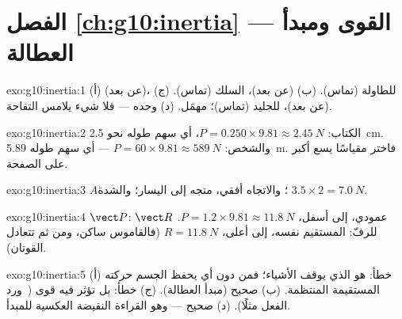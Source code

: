 \section*{الفصل \ref{ch:g10:inertia} --- القوى ومبدأ العطالة}

\begin{solution}{exo:g10:inertia:1}
(أ)  (عن بعد)،  للطاولة (تماس).
(ب)  (عن بعد)،  السلك (تماس).
(ج)  (عن بعد)،  للجليد (تماس)؛ 
مهمَل. (د)  وحده --- فلا شيء يلامس التفاحة.
\end{solution}

\begin{solution}{exo:g10:inertia:2}
الكتاب: $P = 0.250 \times 9.81 \approx \qty{2.45}{N}$، أي سهم طوله نحو
\qty{2.5}{cm}. والشخص: $P = 60 \times 9.81 \approx \qty{589}{N}$
--- أي سهم طوله \qty{5.89}{m}. فاختر مقياسًا يسع أكبر  على
الصفحة.
\end{solution}

\begin{solution}{exo:g10:inertia:3}
 $A$؛ والاتجاه أفقي، متجه إلى اليسار؛
والشدة $3.5 \times 2 = \qty{7.0}{N}$.
\end{solution}

\begin{solution}{exo:g10:inertia:4}
 $\vect P$: عمودي، إلى أسفل، $P = 1.2 \times 9.81 \approx
\qty{11.8}{N}$.  $\vect R$ للرفّ: المستقيم نفسه،
إلى أعلى، $R = \qty{11.8}{N}$ (فالقاموس ساكن، ومن ثم
تتعادل القوتان).
\end{solution}

\begin{solution}{exo:g10:inertia:5}
(أ) خطأ:  هو الذي يوقف الأشياء؛ فمن دون أي  يحفظ الجسم
حركته المستقيمة المنتظمة. (ب) صحيح (مبدأ العطالة).
(ج) خطأ: بل تؤثر فيه قوى \emph{} (\ 
ورد الفعل مثلًا). (د) صحيح --- وهو القراءة النقيضة العكسية
للمبدأ.
\end{solution}


